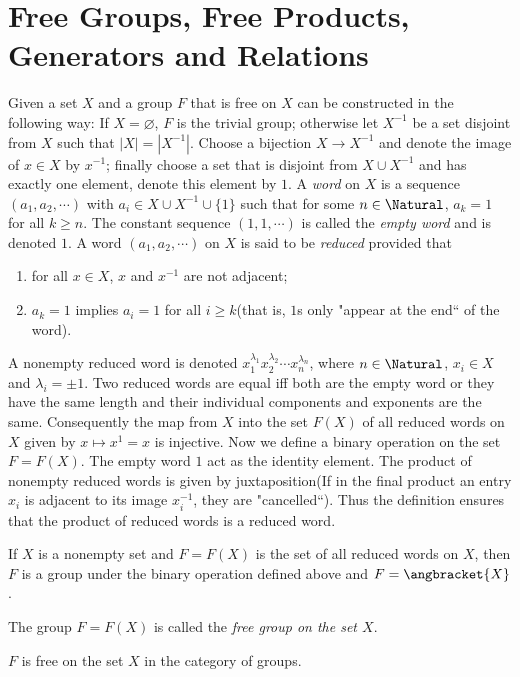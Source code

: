 \section{Free Groups, Free Products, Generators and Relations}
\begin{Definition}
	Given a set $ X $ and a group $ F $ that is free on $ X $ can be constructed in the following way: If $ X= \varnothing $, $ F $ is the trivial group; otherwise let $ X^{-1} $  be a set disjoint from $ X $ such that $ |X| = |X^{-1}| $. Choose a bijection $ X \to X^{-1} $ and denote the image of $ x \in X $ by $ x^{-1} $; finally choose a set that is disjoint from $ X \cup X^{-1} $ and has exactly one element, denote this element by $ 1 $. A \textit{word} on $ X $ is a sequence $ (a_1,a_2,\cdots) $ with $ a_i \in X \cup X^{-1} \cup \{1 \} $ such that for some $ n \in \Natural $, $ a_k=1 $ for all $ k \geqslant n $. The constant sequence $ (1,1,\cdots) $ is called the \textit{empty word} and is denoted $ 1 $. A word $ (a_1,a_2,\cdots) $ on $ X $ is said to be \textit{reduced} provided that
	\begin{enumerate}
		\item for all $ x \in X $, $ x $ and $ x^{-1} $ are not adjacent;
		\item $ a_k=1 $ implies $ a_i=1 $ for all $ i \geqslant k $(that is, $ 1 $s only "appear at the end`` of the word).
	\end{enumerate} 
A nonempty reduced word is denoted $ x_1^{\lambda_1}x_2^{\lambda_2}\cdots x_n^{\lambda_n} $, where $ n \in \Natural $, $ x_i \in X $ and $ \lambda_i = \pm 1 $. Two reduced words are equal iff both are the empty word or they have the same length and their individual components and exponents are the same. Consequently the map from $ X $ into the set $ F(X) $ of all reduced words on $ X $ given by $ x \mapsto x^1 = x $ is injective. Now we define a binary operation on the set $ F = F(X) $. The empty word $ 1 $ act as the identity element. The product of nonempty reduced words is given by juxtaposition(If in the final product an entry $ x_i $ is adjacent to its image $ x_i^{-1} $, they are "cancelled``). Thus the definition ensures that the product of reduced words is a reduced word.
\end{Definition}
\begin{Theorem}
	If $ X $ is a nonempty set and $ F=F(X) $ is the set of all reduced words on $ X $, then $ F $ is a group under the binary operation defined above and $ F = \angbracket{X} $.
\end{Theorem}
The group $ F=F(X) $ is called the \textit{free group on the set $ X $}.
\begin{Theorem}
	$ F $ is free on the set $ X $ in the category of groups.
\end{Theorem}

